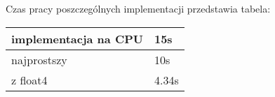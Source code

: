 
Czas pracy poszczególnych implementacji przedstawia tabela:

\begin{tabular}{ |p{\dimexpr 0.5\linewidth}|
                  p{\dimexpr 0.5\linewidth}| }
 \hline
 implementacja na CPU & 15s \\
 \hline
 najprostszy & 10s \\
 \hline
 z float4 & 4.34s \\
 \hline
\end{tabular}

 
